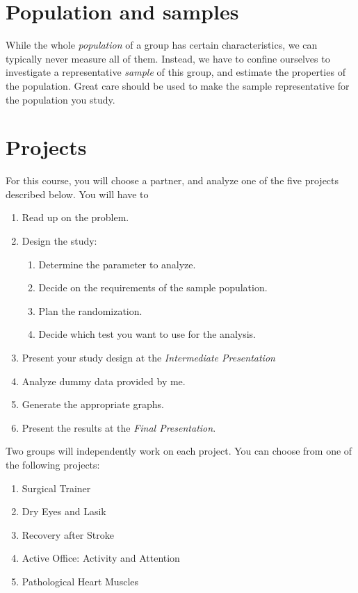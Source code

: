 \section{Population and samples}

While the whole \emph{population} of a group has certain characteristics,
we can typically never measure all of them. Instead, we have to confine
ourselves to investigate a representative \emph{sample} of this group, and
estimate the properties of the population. Great care should be used to make the sample
representative for the population you study.

\section{Projects}

For this course, you will choose a partner, and analyze one of the five projects described below. You will have to

\begin{enumerate}
  \item Read up on the problem.
  \item Design the study:

  \begin{enumerate}
    \item Determine the parameter to analyze.
    \item Decide on the requirements of the sample population.
    \item Plan the randomization.
    \item Decide which test you want to use for the analysis.
  \end{enumerate}

  \item Present your study design at the \emph{Intermediate Presentation}
  \item Analyze dummy data provided by me.
  \item Generate the appropriate graphs.
  \item Present the results at the \emph{Final Presentation}.
\end{enumerate}

Two groups will independently work on each project. You can choose from one of the following projects:

\begin{enumerate}
  \item  Surgical Trainer
  \item  Dry Eyes and Lasik
  \item  Recovery after Stroke
  \item  Active Office: Activity and Attention
  \item  Pathological Heart Muscles
\end{enumerate}

